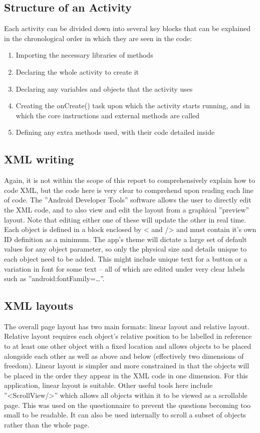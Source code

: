 \subsection{Structure of an Activity}
Each activity can be divided down into several key blocks that can be explained in the chronological order in which they are seen in the code:
\begin{enumerate}
\item Importing the necessary libraries of methods
\item Declaring the whole activity to create it
\item Declaring any variables and objects that the activity uses
\item Creating the onCreate() task upon which the activity starts running, and in which the core instructions and external methods are called
\item Defining any extra methods used, with their code detailed inside
\end{enumerate}
\subsection{XML writing}
Again, it is not within the scope of this report to comprehensively explain how to code XML, but the code here is very clear to comprehend upon reading each line of code. The ''Android Developer Tools'' software allows the user to directly edit the XML code, and to also view and edit the layout from a graphical ''preview'' layout. Note that editing either one of these will update the other in real time. Each object is defined in a block enclosed by < and /> and must contain it’s own ID definition as a minimum. The app’s theme will dictate a large set of default values for any object parameter, so only the physical size and details unique to each object need to be added. This might include unique text for a button or a variation in font for some text – all of which are edited under very clear labels such as ''android:fontFamily=\dots''.
\subsection{XML layouts}
The overall page layout has two main formats: linear layout and relative layout. Relative layout requires each object’s relative position to be labelled in reference to at least one other object with a fixed location and allows objects to be placed alongside each other as well as above and below (effectively two dimensions of freedom). Linear layout is simpler and more constrained in that the objects will be placed in the order they appear in the XML code in one dimension. For this application, linear layout is suitable. Other useful tools here include ''\textless ScrollView/\textgreater'' which allows all objects within it to be viewed as a scrollable page. This was used on the questionnaire to prevent the questions becoming too small to be readable. It can also be used internally to scroll a subset of objects rather than the whole page.
